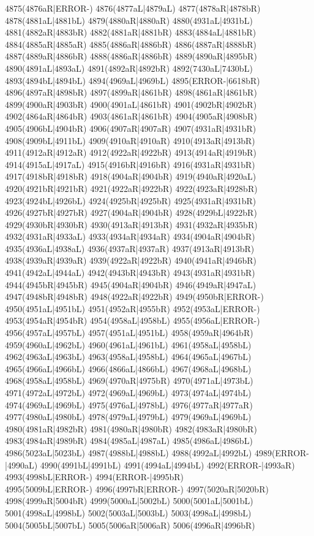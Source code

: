 4875(4876aR|ERROR-) 4876(4877aL|4879aL) 4877(4878aR|4878bR) \\4878(4881aL|4881bL) 4879(4880aR|4880aR) 4880(4931aL|4931bL) 4881(4882aR|4883bR) 4882(4881aR|4881bR) 4883(4884aL|4881bR) 4884(4885aR|4885aR) 4885(4886aR|4886bR) 4886(4887aR|4888bR) \\4887(4889aR|4886bR) 4888(4886aR|4886bR) 4889(4890aR|4895bR) 4890(4891aL|4893aL) 4891(4892aR|4892bR) 4892(7430aL|7430bL) 4893(4894bL|4894bL) 4894(4969aL|4969bL) 4895(ERROR-|6618bR) \\4896(4897aR|4898bR) 4897(4899aR|4861bR) 4898(4861aR|4861bR) 4899(4900aR|4903bR) 4900(4901aL|4861bR) 4901(4902bR|4902bR) 4902(4864aR|4864bR) 4903(4861aR|4861bR) 4904(4905aR|4908bR) \\4905(4906bL|4904bR) 4906(4907aR|4907aR) 4907(4931aR|4931bR) 4908(4909bL|4911bL) 4909(4910aR|4910aR) 4910(4913aR|4913bR) 4911(4912aR|4912aR) 4912(4922aR|4922bR) 4913(4914aR|4919bR) \\4914(4915aL|4917aL) 4915(4916bR|4916bR) 4916(4931aR|4931bR) 4917(4918bR|4918bR) 4918(4904aR|4904bR) 4919(4940aR|4920aL) 4920(4921bR|4921bR) 4921(4922aR|4922bR) 4922(4923aR|4928bR) \\4923(4924bL|4926bL) 4924(4925bR|4925bR) 4925(4931aR|4931bR) 4926(4927bR|4927bR) 4927(4904aR|4904bR) 4928(4929bL|4922bR) 4929(4930bR|4930bR) 4930(4913aR|4913bR) 4931(4932aR|4935bR) \\4932(4931aR|4933aL) 4933(4934aR|4934aR) 4934(4904aR|4904bR) 4935(4936aL|4938aL) 4936(4937aR|4937aR) 4937(4913aR|4913bR) 4938(4939aR|4939aR) 4939(4922aR|4922bR) 4940(4941aR|4946bR) \\4941(4942aL|4944aL) 4942(4943bR|4943bR) 4943(4931aR|4931bR) 4944(4945bR|4945bR) 4945(4904aR|4904bR) 4946(4949aR|4947aL) 4947(4948bR|4948bR) 4948(4922aR|4922bR) 4949(4950bR|ERROR-) \\4950(4951aL|4951bL) 4951(4952aR|4955bR) 4952(4953aL|ERROR-) 4953(4954aR|4954bR) 4954(4958aL|4958bL) 4955(4956aL|ERROR-) 4956(4957aL|4957bL) 4957(4951aL|4951bL) 4958(4959aR|4964bR) \\4959(4960aL|4962bL) 4960(4961aL|4961bL) 4961(4958aL|4958bL) 4962(4963aL|4963bL) 4963(4958aL|4958bL) 4964(4965aL|4967bL) 4965(4966aL|4966bL) 4966(4866aL|4866bL) 4967(4968aL|4968bL) \\4968(4958aL|4958bL) 4969(4970aR|4975bR) 4970(4971aL|4973bL) 4971(4972aL|4972bL) 4972(4969aL|4969bL) 4973(4974aL|4974bL) 4974(4969aL|4969bL) 4975(4976aL|4978bL) 4976(4977aR|4977aR) \\4977(4980aL|4980bL) 4978(4979aL|4979bL) 4979(4969aL|4969bL) 4980(4981aR|4982bR) 4981(4980aR|4980bR) 4982(4983aR|4980bR) 4983(4984aR|4989bR) 4984(4985aL|4987aL) 4985(4986aL|4986bL) \\4986(5023aL|5023bL) 4987(4988bL|4988bL) 4988(4992aL|4992bL) 4989(ERROR-|4990aL) 4990(4991bL|4991bL) 4991(4994aL|4994bL) 4992(ERROR-|4993aR) 4993(4998bL|ERROR-) 4994(ERROR-|4995bR) \\4995(5009bL|ERROR-) 4996(4997bR|ERROR-) 4997(5020aR|5020bR) 4998(4999aR|5004bR) 4999(5000aL|5002bL) 5000(5001aL|5001bL) 5001(4998aL|4998bL) 5002(5003aL|5003bL) 5003(4998aL|4998bL) \\5004(5005bL|5007bL) 5005(5006aR|5006aR) 5006(4996aR|4996bR) 